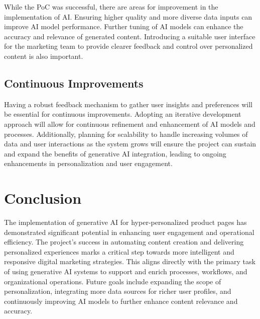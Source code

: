 \documentclass[%
pdftex,
oneside,			%
11pt,				%
parskip=half,		%
headheight = 12pt,	%
headsepline,		%
footsepline,		%
footheight = 16pt,	%
abstracton,		%
DIV=calc,		%
BCOR=8mm,		%
headinclude=false,	%
footinclude=false,	%
listof=totoc,		%
toc=bibliography,	%
]{scrreprt}	%
\begin{document}
        While the PoC was successful, there are areas for improvement in the implementation of AI. 
        Ensuring higher quality and more diverse data inputs can improve AI model performance. 
        Further tuning of AI models can enhance the accuracy and relevance of generated content. 
        Introducing a suitable user interface for the marketing team to provide clearer feedback and control over personalized content is also important.

    \section{Continuous Improvements}

        Having a robust feedback mechanism to gather user insights and preferences will be essential for continuous improvements. 
        Adopting an iterative development approach will allow for continuous refinement and enhancement of AI models and processes. 
        Additionally, planning for scalability to handle increasing volumes of data and user interactions as the system grows will ensure the project can sustain and expand the benefits of generative AI integration, leading to ongoing enhancements in personalization and user engagement.

    \newpage

\chapter{Conclusion}


    The implementation of generative AI for hyper-personalized product pages has demonstrated significant potential in enhancing user engagement and operational efficiency. 
    The project's success in automating content creation and delivering personalized experiences marks a critical step towards more intelligent and responsive digital marketing strategies. 
    This aligns directly with the primary task of using generative AI systems to support and enrich processes, workflows, and organizational operations.
    Future goals include expanding the scope of personalization, integrating more data sources for richer user profiles, and continuously improving AI models to further enhance content relevance and accuracy.
    
\end{document}
